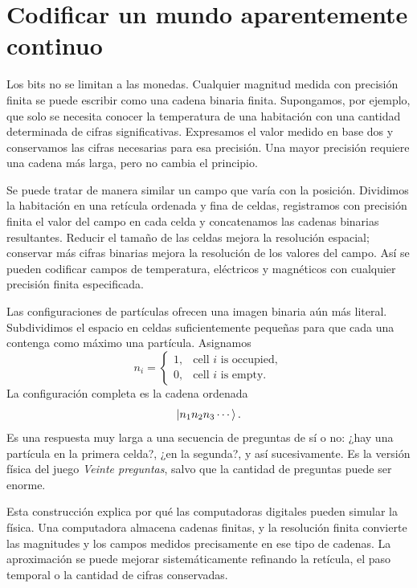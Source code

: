 \section{Codificar un mundo aparentemente continuo}

Los bits no se limitan a las monedas. Cualquier magnitud medida con precisión finita se puede escribir como una cadena binaria finita. Supongamos, por ejemplo, que solo se necesita conocer la temperatura de una habitación con una cantidad determinada de cifras significativas. Expresamos el valor medido en base dos y conservamos las cifras necesarias para esa precisión. Una mayor precisión requiere una cadena más larga, pero no cambia el principio.

Se puede tratar de manera similar un campo que varía con la posición. Dividimos la habitación en una retícula ordenada y fina de celdas, registramos con precisión finita el valor del campo en cada celda y concatenamos las cadenas binarias resultantes. Reducir el tamaño de las celdas mejora la resolución espacial; conservar más cifras binarias mejora la resolución de los valores del campo. Así se pueden codificar campos de temperatura, eléctricos y magnéticos con cualquier precisión finita especificada.

Las configuraciones de partículas ofrecen una imagen binaria aún más literal. Subdividimos el espacio en celdas suficientemente pequeñas para que cada una contenga como máximo una partícula. Asignamos
\begin{equation}
  n_i=
  \begin{cases}
    1,&\text{cell \(i\) is occupied},\\
    0,&\text{cell \(i\) is empty}.
  \end{cases}
  \label{eq:l01-occupancy-bit}
\end{equation}
La configuración completa es la cadena ordenada
\begin{equation}
  \left\lvert n_1n_2n_3\cdots\right\rangle.
\end{equation}
Es una respuesta muy larga a una secuencia de preguntas de sí o no: ¿hay una partícula en la primera celda?, ¿en la segunda?, y así sucesivamente. Es la versión física del juego \emph{Veinte preguntas}, salvo que la cantidad de preguntas puede ser enorme.

Esta construcción explica por qué las computadoras digitales pueden simular la física. Una computadora almacena cadenas finitas, y la resolución finita convierte las magnitudes y los campos medidos precisamente en ese tipo de cadenas. La aproximación se puede mejorar sistemáticamente refinando la retícula, el paso temporal o la cantidad de cifras conservadas.

